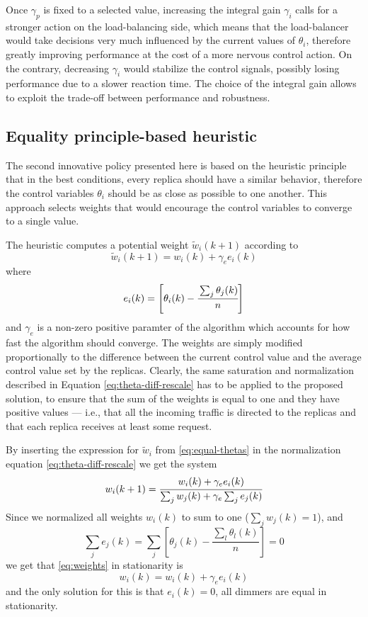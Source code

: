 Once $\gamma_p$ is fixed to a selected value, increasing the integral
gain $\gamma_i$ calls for a stronger action on the load-balancing
side, which means that the load-balancer would take decisions very
much influenced by the current values of $\theta_i$, therefore greatly
improving performance at the cost of a more nervous control action. On
the contrary, decreasing $\gamma_i$ would stabilize the control
signals, possibly losing performance due to a slower reaction
time. The choice of the integral gain allows to exploit the trade-off
between performance and robustness.


\subsection{Equality principle-based heuristic}

The second innovative policy presented here is based on the heuristic principle
that in the best conditions, every replica should have a similar
behavior, therefore the control variables $\theta_i$ should be as
close as possible to one another. This approach selects weights that
would encourage the control variables to converge to a single value.

The heuristic computes a potential weight $\tilde{w}_i(k+1)$ according
to
\begin{equation}
  \tilde{w}_i(k+1) = w_i(k) + \gamma_e e_i(k)
\label{eq:equal-thetas}
\end{equation}
where
$$e_i(k)=\left[ \theta_i (k) - \cfrac{\sum_j \theta_j (k) }{n} \right]$$
and $\gamma_e$ is a non-zero positive paramter of the algorithm which accounts
for how fast the algorithm should converge. The weights are simply modified
proportionally to the difference between the current control value and
the average control value set by the replicas. Clearly, the same
saturation and normalization described in Equation
\eqref{eq:theta-diff-rescale} has to be applied to the proposed
solution, to ensure that the sum of the weights is equal to one and
they have positive values --- i.e., that all the incoming traffic is
directed to the replicas and that each replica receives at least some
request.

By inserting the expression for $\tilde w_i$ from \eqref{eq:equal-thetas}
in the normalization equation \eqref{eq:theta-diff-rescale} we get the system
\begin{equation}
  w_i(k+1)=\cfrac{w_i(k)+\gamma_ee_i(k)}{\sum_jw_j(k)+\gamma_e\sum_je_j(k)}
\label{eq:weights}
\end{equation}
Since we normalized all weights $w_i(k)$ to sum to one ($\sum_jw_j(k)=1$), and
$$\sum_je_j(k)=\sum_j\left[\theta_j(k)-\frac{\sum_l\theta_l(k)}{n}\right]=0$$
we get that \eqref{eq:weights} in stationarity is
$$w_i(k)=w_i(k)+\gamma_ee_i(k)$$
and the only solution for this is that $e_i(k)=0$, all dimmers are equal in
stationarity.

